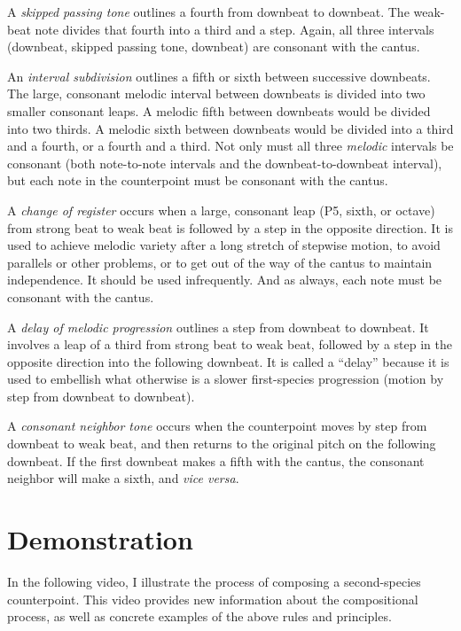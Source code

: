 \documentclass{book}
\begin{document}
A \emph{skipped passing tone} outlines a fourth from downbeat to downbeat. The
weak-beat note divides that fourth into a third and a step. Again, all three
intervals (downbeat, skipped passing tone, downbeat) are consonant with the
cantus.

An \emph{interval subdivision} outlines a fifth or sixth between successive
downbeats. The large, consonant melodic interval between downbeats is divided
into two smaller consonant leaps. A melodic fifth between downbeats would be
divided into two thirds. A melodic sixth between downbeats would be divided
into a third and a fourth, or a fourth and a third. Not only must all three
\emph{melodic} intervals be consonant (both note-to-note intervals and the
downbeat-to-downbeat interval), but each note in the counterpoint must be
consonant with the cantus.

A \emph{change of register} occurs when a large, consonant leap (P5, sixth, or
octave) from strong beat to weak beat is followed by a step in the opposite
direction. It is used to achieve melodic variety after a long stretch of
stepwise motion, to avoid parallels or other problems, or to get out of the
way of the cantus to maintain independence. It should be used infrequently.
And as always, each note must be consonant with the cantus.

A \emph{delay of melodic progression} outlines a step from downbeat to
downbeat. It involves a leap of a third from strong beat to weak beat,
followed by a step in the opposite direction into the following downbeat. It
is called a ``delay'' because it is used to embellish what otherwise is a
slower first-species progression (motion by step from downbeat to downbeat).

A \emph{consonant neighbor tone} occurs when the counterpoint moves by step
from downbeat to weak beat, and then returns to the original pitch on the
following downbeat. If the first downbeat makes a fifth with the cantus, the
consonant neighbor will make a sixth, and \emph{vice versa}.

\hypertarget{demonstration-1}{%
\section{Demonstration}\label{demonstration-1}}

In the following video, I illustrate the process of composing a second-species
counterpoint. This video provides new information about the compositional
process, as well as concrete examples of the above rules and principles.
\end{document}
